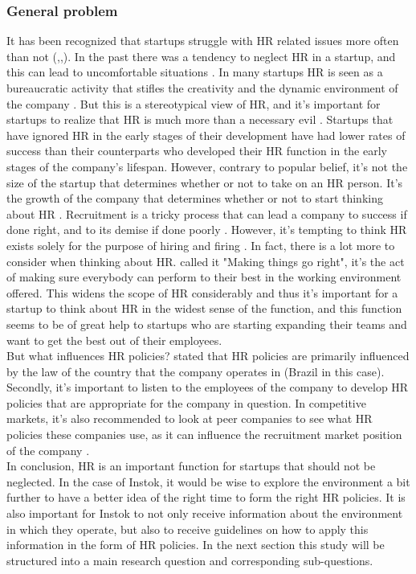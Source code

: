 \documentclass[man]{apa6}
\begin{document}
\subsubsection{General problem} It has been recognized that startups struggle with HR related issues more often than not (\parencite{FUNG2012},\parencite{WEISSMAN2016},\parencite{BUCH2016}). In the past there was a tendency to neglect HR in a startup, and this can lead to uncomfortable situations \parencite{WEISSMAN2016}. In many startups HR is seen as a bureaucratic activity that stifles the creativity and the dynamic environment of the company \parencite{FUNG2012}. But this is a stereotypical view of HR, and it's important for startups to realize that HR is much more than a necessary evil \parencite{WEISSMAN2016}. Startups that have ignored HR in the early stages of their development have had lower rates of success than their counterparts who developed their HR function in the early stages of the company's lifespan. However, contrary to popular belief, it's not the size of the startup that determines whether or not to take on an HR person. It's the growth of the company that determines whether or not to start thinking about HR \parencite{COY2015}. Recruitment is a tricky process that can lead a company to success if done right, and to its demise if done poorly \parencite{MUMBAI2014}. However, it's tempting to think HR exists solely for the purpose of hiring and firing \parencite{COY2015}. In fact, there is a lot more to consider when thinking about HR. \cite{COY2015} called it "Making things go right", it's the act of making sure everybody can perform to their best in the working environment offered. This widens the scope of HR considerably and thus it's important for a startup to think about HR in the widest sense of the function, and this function seems to be of great help to startups who are starting expanding their teams and want to get the best out of their employees.\\
But what influences HR policies? \cite{HRCA2016} stated that HR policies are primarily influenced by the law of the country that the company operates in (Brazil in this case). Secondly, it's important to listen to the employees of the company to develop HR policies that are appropriate for the company in question. In competitive markets, it's also recommended to look at peer companies to see what HR policies these companies use, as it can influence the recruitment market position of the company \parencite{HRCA2016}.\\
In conclusion, HR is an important function for startups that should not be neglected. In the case of Instok, it would be wise to explore the environment a bit further to have a better idea of the right time to form the right HR policies. It is also important for Instok to not only receive information about the environment in which they operate, but also to receive guidelines on how to apply this information in the form of HR policies. In the next section this study will be structured into a main research question and corresponding sub-questions. 
\end{document}
